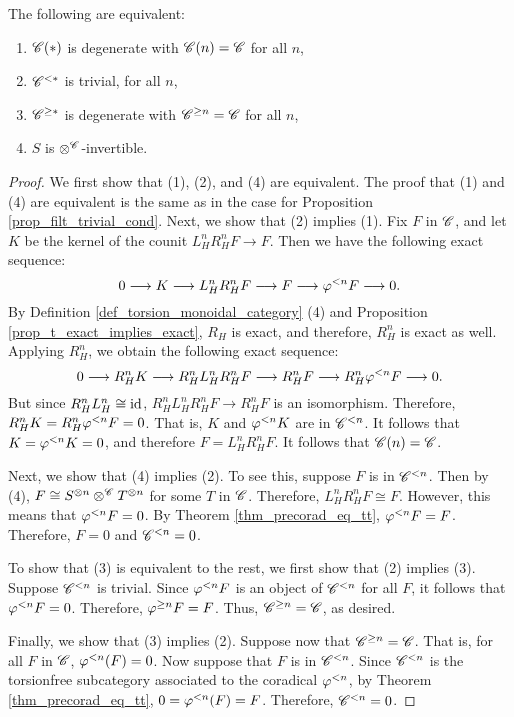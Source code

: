 \begin{prop}\label{prop_torsion_filt_degen_cond}
The following are equivalent:
\begin{enumerate}
\item $\SGFilt{*}{\Cat{C}}$ is degenerate with $\SGFilt{n}{\Cat{C}} = 
\Cat{C}$ for all $n$,

\item $\Corad{*}{\Cat{C}}$ is trivial,
for all $n$,

\item $\Prerad{*}{\Cat{C}}$ is degenerate with $\Prerad{n}{\Cat{C}} = 
\Cat{C}$ for all $n$,

\item $S$ is $\tensor^{\Cat{C}}$-invertible.
\end{enumerate}
\end{prop}
\begin{proof}
We first show that (1), (2), and (4) are equivalent. The proof that
(1) and (4) are equivalent is the same as in the case for Proposition
\ref{prop_filt_trivial_cond}. Next, we show that (2) implies (1).
 Fix $F$ in $\Cat{C}$, and let $K$ be the kernel of
the counit $L_H^n R_H^n F \to F$. Then we have the following exact
sequence:
\[
0 \to K \to L_H^n R_H^n F \to F \to \corad{n} F \to 0.
\]
By Definition \ref{def_torsion_monoidal_category} (4) and Proposition
\ref{prop_t_exact_implies_exact}, $R_H$ is exact, and therefore, $R_H^n$
is exact as well. Applying $R_H^n$, we obtain the following exact sequence:
\[
0 \to R_H^n K \to R_H^n L_H^n R_H^n F \to R_H^n F \to R_H^n \corad{n} F \to 0.
\]
But since $R_H^n L_H^n \cong \id$, $R_H^n L_H^n R_H^n F \to R_H^n F$ is 
an isomorphism. Therefore, $R_H^n K = R_H^n \corad{n} F = 0$. That is,
$K$ and $\corad{n} K$ are in $\Corad{n}{\Cat{C}}$. It follows that
$K = \corad{n} K = 0$, and therefore $F = L_H^n R_H^n F$. It follows that
$\SGFilt{n}{\Cat{C}} = \Cat{C}$.

Next, we show that (4) implies (2). To see this, suppose $F$ is in 
$\Corad{n}{\Cat{C}}$. Then by (4), $F \cong S^{\tensor n} 
\tensor^{\Cat{C}} T^{\tensor n}$ for some $T$ in $\Cat{C}$. Therefore,
$L_H^n R_H^n F \cong F$. However, this means that $\corad{n} F = 0$.
By Theorem \ref{thm_precorad_eq_tt}, $\corad{n} F = F$. Therefore,
$F = 0$ and $\Corad{n}{\Cat{C}} = 0$.

To show that (3) is equivalent to the rest, we first show that (2) 
implies (3). Suppose $\Corad{n}{\Cat{C}}$ is trivial. Since 
$\corad{n} F$ is an object of $\Corad{n}{\Cat{C}}$ for all $F$, it 
follows that $\corad{n}F = 0$. Therefore, $\prerad{n}F = F$. Thus, 
$\Prerad{n}{\Cat{C}} = \Cat{C}$, as desired.

Finally, we show that (3) implies (2). Suppose now that 
$\Prerad{n}{\Cat{C}} = \Cat{C}$. That is, for all $F$ in 
$\Cat{C}$, $\corad{n}(F) = 0$. Now suppose that $F$ is in 
$\Corad{n}{\Cat{C}}$. Since $\Corad{n}{\Cat{C}}$ is the 
torsionfree subcategory associated to the coradical $\corad{n}$, 
by Theorem \ref{thm_precorad_eq_tt}, $0 = \corad{n}(F) = F$. 
Therefore, $\Corad{n}{\Cat{C}} = 0$.
\end{proof}

